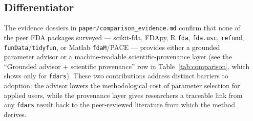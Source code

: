 \subsection{Differentiator}

The evidence dossiers in \texttt{paper/comparison\_evidence.md} confirm that
none of the peer FDA packages surveyed --- scikit-fda, FDApy, R \texttt{fda},
\texttt{fda.usc}, \texttt{refund}, \texttt{funData}/\texttt{tidyfun}, or
Matlab \texttt{fdaM}/PACE --- provides either a grounded parameter advisor or
a machine-readable scientific-provenance layer (see the ``Grounded advisor +
scientific provenance'' row in Table~\ref{tab:comparison}, which shows
\checkmark{} only for \texttt{fdars}).  These two contributions address
distinct barriers to adoption: the advisor lowers the methodological cost of
parameter selection for applied users, while the provenance layer gives
researchers a traceable link from any \texttt{fdars} result back to the
peer-reviewed literature from which the method derives.
